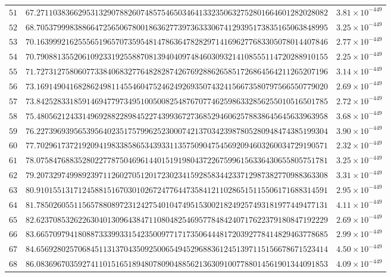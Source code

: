 \documentclass[12pt,reqno]{amsart}
\theoremstyle{remark}
\begin{document}
\begin{longtable}{clc}
$51$ & $67.2711038366295313290788260748575465034641332350632752801664601282028082$ & $3.81\times 10^{-449}$ \\
$52$ & $68.7053799983886647256506780018636277397363330674129395173835165063848995$ & $3.25\times 10^{-449}$ \\
$53$ & $70.1639992162555651965707359548147863647828297141696277683305078014407846$ & $2.77\times 10^{-449}$ \\
$54$ & $70.7908813552061092331925588708139404097484603093214108555114720288910155$ & $2.25\times 10^{-449}$ \\
$55$ & $71.7273127580607733840683277648282874267692886265851726864564211265207196$ & $3.14\times 10^{-449}$ \\
$56$ & $73.1691490416828624981145546047524624926935074324156673580797566550779020$ & $2.69\times 10^{-449}$ \\
$57$ & $73.8425283318591469477973495100500825487670774625986332856255010516501785$ & $2.72\times 10^{-449}$ \\
$58$ & $75.4805621243314969288228984522743993672736852946062578838645645633963958$ & $3.68\times 10^{-449}$ \\
$59$ & $76.2273969395653956402351757996252300074213703423987805280948474385199304$ & $3.90\times 10^{-449}$ \\
$60$ & $77.7029617372192094198338586534393311357509047545692094603260034729190571$ & $2.32\times 10^{-449}$ \\
$61$ & $78.0758476883528022778750469614401519198043722675996156336430655805751781$ & $3.25\times 10^{-449}$ \\
$62$ & $79.2073297499892397112602705120172302341592858344233712987382770988363308$ & $3.31\times 10^{-449}$ \\
$63$ & $80.9101551317124588151670301026724776447358412110286515115506171688314591$ & $2.95\times 10^{-449}$ \\
$64$ & $81.7850260551156578808972312427540104749515300218249257493181977449477131$ & $4.11\times 10^{-449}$ \\
$65$ & $82.6237085326226304013096438471108048254695778484240717622379180847192229$ & $2.69\times 10^{-449}$ \\
$66$ & $83.6657097941808873339933154235009771717350644481720392778414829463778685$ & $2.99\times 10^{-449}$ \\
$67$ & $84.6569280257068451131370435092500654945296883612451397115156678671523414$ & $4.50\times 10^{-449}$ \\
$68$ & $86.0836967035927411015165189480780904885621363091007788014561901344091853$ & $4.09\times 10^{-449}$ \\

\end{longtable}
\end{document}
